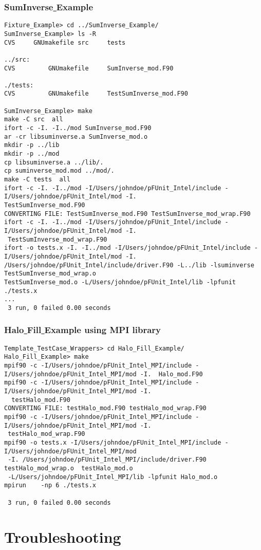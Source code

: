 \documentclass[10pt]{article}
\begin{document}
\subsubsection{SumInverse\underline{ }Example}

{\small \begin{verbatim}
Fixture_Example> cd ../SumInverse_Example/
SumInverse_Example> ls -R
CVS		GNUmakefile	src		tests

../src:
CVS			GNUmakefile		SumInverse_mod.F90

./tests:
CVS			GNUmakefile		TestSumInverse_mod.F90

SumInverse_Example> make
make -C src  all
ifort -c -I. -I../mod SumInverse_mod.F90 
ar -cr libsuminverse.a SumInverse_mod.o
mkdir -p ../lib
mkdir -p ../mod
cp libsuminverse.a ../lib/.
cp suminverse_mod.mod ../mod/.
make -C tests  all
ifort -c -I. -I../mod -I/Users/johndoe/pFUnit_Intel/include -I/Users/johndoe/pFUnit_Intel/mod -I. 
TestSumInverse_mod.F90
CONVERTING FILE: TestSumInverse_mod.F90 TestSumInverse_mod_wrap.F90
ifort -c -I. -I../mod -I/Users/johndoe/pFUnit_Intel/include -I/Users/johndoe/pFUnit_Intel/mod -I.
 TestSumInverse_mod_wrap.F90
ifort -o tests.x -I. -I../mod -I/Users/johndoe/pFUnit_Intel/include -I/Users/johndoe/pFUnit_Intel/mod -I. 
/Users/johndoe/pFUnit_Intel/include/driver.F90 -L../lib -lsuminverse  TestSumInverse_mod_wrap.o  
TestSumInverse_mod.o -L/Users/johndoe/pFUnit_Intel/lib -lpfunit 
./tests.x     
...
 3 run, 0 failed 0.00 seconds

\end{verbatim}
}

\subsubsection{Halo\underline{ }Fill\underline{ }Example using MPI library}

{\small \begin{verbatim}
Template_TestCase_Wrappers> cd Halo_Fill_Example/
Halo_Fill_Example> make
mpif90 -c -I/Users/johndoe/pFUnit_Intel_MPI/include -I/Users/johndoe/pFUnit_Intel_MPI/mod -I.  Halo_mod.F90
mpif90 -c -I/Users/johndoe/pFUnit_Intel_MPI/include -I/Users/johndoe/pFUnit_Intel_MPI/mod -I.
  testHalo_mod.F90
CONVERTING FILE: testHalo_mod.F90 testHalo_mod_wrap.F90
mpif90 -c -I/Users/johndoe/pFUnit_Intel_MPI/include -I/Users/johndoe/pFUnit_Intel_MPI/mod -I. 
 testHalo_mod_wrap.F90
mpif90 -o tests.x -I/Users/johndoe/pFUnit_Intel_MPI/include -I/Users/johndoe/pFUnit_Intel_MPI/mod
 -I. /Users/johndoe/pFUnit_Intel_MPI/include/driver.F90  testHalo_mod_wrap.o  testHalo_mod.o 
 -L/Users/johndoe/pFUnit_Intel_MPI/lib -lpfunit Halo_mod.o
mpirun    -np 6 ./tests.x     
 
 3 run, 0 failed 0.00 seconds
\end{verbatim}
}

\section{Troubleshooting}
\end{document}
